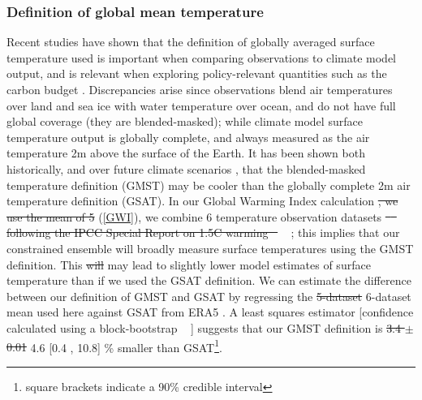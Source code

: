 \documentclass[gmd, manuscript]{copernicus}
\providecommand{\DIFadd}[1]{{\protect\color{blue}#1}} %
\providecommand{\DIFdel}[1]{{\protect\color{red}\sout{#1}}}                      %
\providecommand{\DIFaddbegin}{} %
\providecommand{\DIFaddend}{} %
\providecommand{\DIFdelbegin}{} %
\providecommand{\DIFdelend}{} %
\begin{document}
\subsubsection{Definition of global mean temperature}
Recent studies \citep{Richardson2016,Richardson2018} have shown that the definition of globally averaged surface temperature used is important when comparing observations to climate model output, and is relevant when exploring policy-relevant quantities such as the carbon budget \citep{Tokarska2019}. Discrepancies arise since observations blend air temperatures over land and sea ice with water temperature over ocean, and do not have full global coverage (they are blended-masked); while climate model surface temperature output is globally complete, and always measured as the air temperature 2m above the surface of the Earth. It has been shown both historically, and over future climate scenarios \citep{Richardson2018}, that the blended-masked temperature definition (GMST) may be cooler than the globally complete 2m air temperature definition (GSAT). In our Global Warming Index calculation \DIFdelbegin \DIFdel{, we use the mean of 5 }\DIFdelend \DIFaddbegin \DIFadd{(\ref{GWI}), we combine 6 }\DIFaddend temperature observation datasets \DIFdelbegin \DIFdel{\mbox{%
\citep{Lenssen2019,Cowtan2014,Vose2012,Morice2011,Rohde2013} }\hspace{0pt}%
following the IPCC Special Report on 1.5\textdegree C warming \mbox{%
\citep{IPCC2018}}\hspace{0pt}%
}\DIFdelend \DIFaddbegin \DIFadd{\mbox{%
\citep{Lenssen2019,Cowtan2014,Vose2012,Morice2011,Rohde2013,Morice2020}}\hspace{0pt}%
}\DIFaddend ; this implies that our constrained ensemble will \DIFaddbegin \DIFadd{broadly }\DIFaddend measure surface temperatures using the GMST definition. This \DIFdelbegin \DIFdel{will }\DIFdelend \DIFaddbegin \DIFadd{may }\DIFaddend lead to slightly lower model estimates of surface temperature than if we used the GSAT definition. We can estimate the difference between our definition of GMST and GSAT by regressing the \DIFdelbegin \DIFdel{5-dataset }\DIFdelend \DIFaddbegin \DIFadd{6-dataset }\DIFaddend mean used here against GSAT from ERA5 \citep{Hersbach2020}. A least squares estimator \DIFaddbegin [\DIFadd{confidence calculated using a block-bootstrap \mbox{%
\citep{Wilks1997}}\hspace{0pt}%
}] \DIFaddend suggests that our GMST definition is \DIFdelbegin \DIFdel{3.4 $\pm$ 0.01 }\DIFdelend \DIFaddbegin \DIFadd{4.6 }[\DIFadd{0.4 , 10.8}] \DIFaddend \% smaller than GSAT\DIFaddbegin \footnote{\DIFadd{square brackets indicate a 90\% credible interval}}\DIFaddend .
\end{document}
